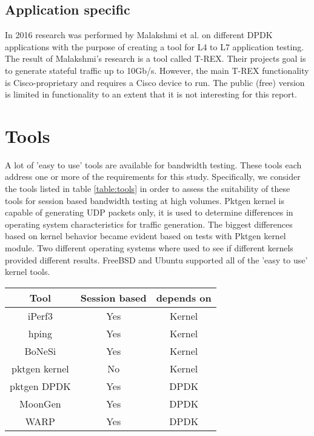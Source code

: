 \subsection{Application specific}
In 2016 research was performed by Malakshmi et al. \cite{mahalakshmi2016study} on different DPDK applications with the purpose of creating a tool for L4 to L7 application testing. 
The result of Malakshmi's research is a tool called T-REX. Their projects goal is to generate stateful traffic up to 10Gb/s. 
However, the main T-REX functionality is Cisco-proprietary and requires a Cisco device to run. The public (free) version is limited in functionality to an extent that it is not interesting for this report.
\section{Tools}\label{sec:tools}
A lot of 'easy to use' tools are available for bandwidth testing. These tools each address one or more of the requirements for this study.
Specifically, we consider the tools listed in table \ref{table:tools} in order to assess the suitability of these tools for session based bandwidth testing at high volumes.
Pktgen kernel is capable of generating UDP packets only, it is used to determine differences in operating system characteristics for traffic generation. 
The biggest differences based on kernel behavior became evident based on tests with Pktgen kernel module.
Two different operating systems where used to see if different kernels provided different results. FreeBSD and Ubuntu supported all of the 'easy to use' kernel tools.

\begin{table*}[ht]
\centering
\begin{tabular}{|c|c|c|} \hline
\textbf{Tool} & \textbf{Session based} & \textbf{depends on} \\ \hline
iPerf3\cite{iperf} & Yes & Kernel  \\ \hline
hping\cite{hping}  & Yes & Kernel \\ \hline
BoNeSi\cite{bonesi} & Yes & Kernel \\ \hline
pktgen kernel\cite{pktgen-kernel} & No & Kernel \\ \hline
pktgen DPDK\cite{pktgen-dpdk} & Yes & DPDK \\ \hline
MoonGen\cite{moongen} & Yes & DPDK \\ \hline
WARP\cite{warp} & Yes & DPDK \\ \hline
\end{tabular}
\caption{Tested tools}
\label{table:tools}
\end{table*} 

